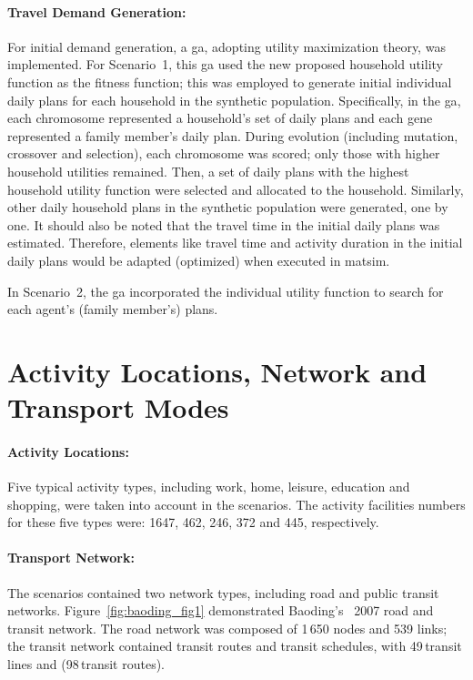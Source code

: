 \paragraph{Travel Demand Generation:}
For initial demand generation, a \gls{ga}, adopting utility maximization theory, was implemented. 
For Scenario~1, this \gls{ga} used the new proposed household utility function as the fitness function; this was employed to generate initial individual daily plans for each household in the synthetic population. 
Specifically, in the \gls{ga}, each chromosome represented a household's set of daily plans and each gene represented a family member's daily plan. 
During evolution (including mutation, crossover and selection), each chromosome was scored; only those with higher household utilities remained. 
Then, a set of daily plans with the highest household utility function were selected and allocated to the household. 
Similarly, other daily household plans in the synthetic population were generated, one by one. 
It should also be noted that the travel time in the initial daily plans was estimated. 
Therefore, elements like travel time and activity duration in the initial daily plans would be adapted (optimized) when executed in \gls{matsim}.

In Scenario~2, the \gls{ga} incorporated the individual utility function to search for each agent's (family member's) plans.

\section{Activity Locations, Network and Transport Modes}
\paragraph{Activity Locations:} Five typical activity types, including work, home, leisure, education and shopping, were taken into account in the scenarios. 
The activity facilities numbers for these five types were: 1647, 462, 246, 372 and 445, respectively. 

\paragraph{Transport Network:} The scenarios contained two network types, including road and public transit networks. 
Figure~\ref{fig:baoding_fig1} demonstrated Baoding's ~2007 road and transit network. The road network was composed of 1\,650 nodes and 539 links; the transit network contained transit routes and transit schedules, with  49\,transit lines and (98\,transit routes). 

